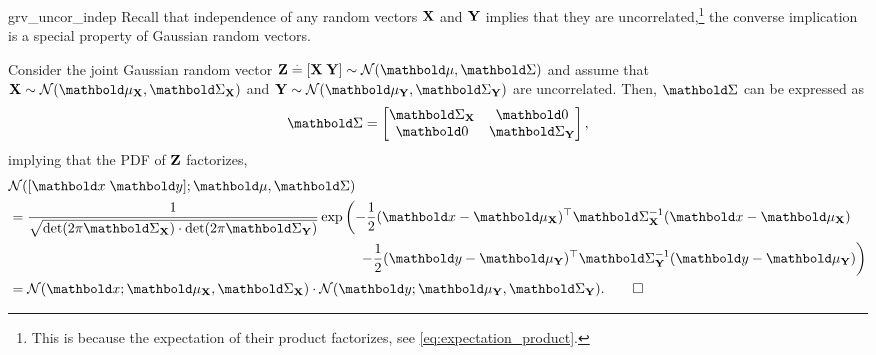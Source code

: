 \begin{solution}{grv_uncor_indep}
  Recall that independence of any random vectors $\mathbf{X}$ and $\mathbf{Y}$ implies that they are uncorrelated,\footnote{This is because the expectation of their product factorizes, see \cref{eq:expectation_product}.} the converse implication is a special property of Gaussian random vectors.

  Consider the joint Gaussian random vector $\rZ \defeq [\rX \; \rY] \sim \N{\vmu}{\mSigma}$ and assume that $\rX \sim \N{\vmu_{\rX}}{\mSigma_{\rX}}$ and $\rY \sim \N{\vmu_{\rY}}{\mSigma_{\rY}}$ are uncorrelated. Then, $\mSigma$ can be expressed as \begin{align*}
    \mSigma = \begin{bmatrix}
      \mSigma_{\rX} & \mzero \\
      \mzero & \mSigma_{\rY} \\
    \end{bmatrix},
  \end{align*} implying that the PDF of $\mathbf{Z}$ factorizes, \begin{align*}
    &\N[[\vx \; \vy]]{\vmu}{\mSigma} \\
    &= \begin{multlined}[t]
      \frac{1}{\sqrt{\det{2\pi\mSigma_{\rX}} \cdot \det{2\pi\mSigma_{\rY}}}} \exp\left(-\frac{1}{2}\transpose{(\vx-\vmu_{\rX})}\inv{\mSigma_{\rX}}(\vx-\vmu_{\rX}) \right. \\ \left. -\frac{1}{2}\transpose{(\vy-\vmu_{\rY})}\inv{\mSigma_{\rY}}(\vy-\vmu_{\rY})\right)
    \end{multlined} \\
    &= \N[\vx]{\vmu_{\rX}}{\mSigma_{\rX}} \cdot \N[\vy]{\vmu_{\rY}}{\mSigma_{\rY}}. \qedhere
  \end{align*}
\end{solution}

